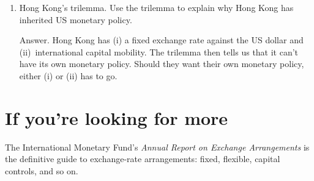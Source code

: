 \begin{enumerate}
\item Hong Kong's trilemma.
Use the trilemma to explain why Hong Kong has inherited US monetary policy.

Answer.  Hong Kong has (i) a fixed exchange rate against the US dollar and
(ii)~international capital mobility.
The trilemma then tells us that it can't have its own monetary policy.
Should they want their own monetary policy, either (i) or (ii) has to go.
\end{enumerate}


\section*{If you're looking for more}

The International Monetary Fund's
{\it Annual Report on Exchange Arrangements\/}
is the definitive guide to exchange-rate arrangements:  fixed,
flexible, capital controls, and so on.
